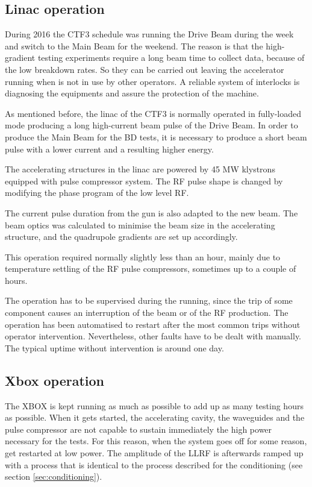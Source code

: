 \subsection{Linac operation}

During 2016 the CTF3 schedule was running the Drive Beam during the week and switch to the Main Beam for the weekend. The reason is that the high-gradient testing experiments require a long beam time to collect data, because of the low breakdown rates. So they can be carried out leaving the accelerator running when is not in use by other operators. A reliable system of interlocks is diagnosing the equipments and assure the protection of the machine. 

As mentioned before, the linac of the CTF3 is normally operated in fully-loaded mode producing a long  high-current beam pulse of the Drive Beam. In order to produce the Main Beam for the BD tests, it is necessary to produce a short beam pulse with a lower current and a resulting higher energy. 

The accelerating structures in the linac are powered by 45 MW klystrons equipped with pulse compressor system. 
The RF pulse shape is changed by modifying the phase program of the low level RF.

The current pulse duration from the gun is also adapted to the new beam. The beam optics was calculated to minimise the beam size in the accelerating structure, and the quadrupole gradients are set up accordingly.

This operation required normally slightly less than an hour, mainly due to temperature settling of the RF pulse compressors, sometimes up to a couple of hours.

The operation has to be supervised during the running, since the trip of some component causes an interruption of the beam or of the RF production. The operation has been automatised to restart after the most common trips without operator intervention. Nevertheless, other faults have to be dealt with manually. The typical uptime without intervention is around one day.

\subsection{Xbox operation}
\label{sec:xboxop}

The XBOX is kept running as much as possible to add up as many testing hours as possible. When it gets started, the accelerating cavity, the waveguides and the pulse compressor are not capable to sustain immediately the high power necessary for the tests. For this reason, when the system goes off for some reason, get restarted at low power. The amplitude of the LLRF is afterwards ramped up with a process that is identical to the process described for the conditioning (see section \ref{sec:conditioning}).

